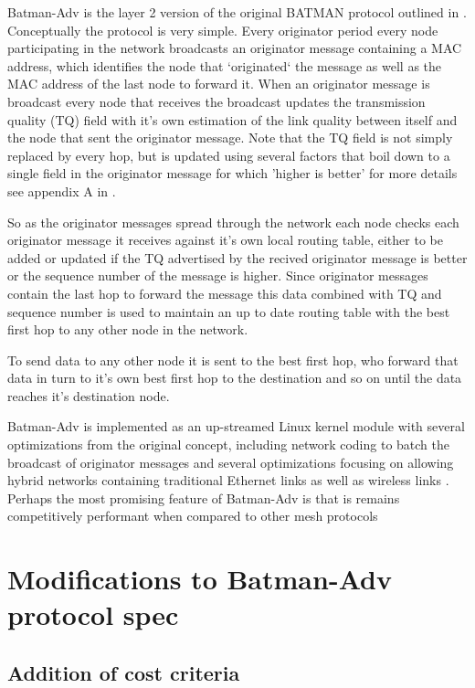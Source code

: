 \documentclass[11pt]{article}
\begin{document}
    Batman-Adv is the layer 2 version of the original BATMAN protocol outlined in \cite{batman}. Conceptually the protocol is very simple. Every originator period every node participating in the network broadcasts an originator message containing a MAC address, which identifies the node that `originated` the message as well as the MAC address of the last node to forward it.  When an originator message is broadcast every node that receives the broadcast updates the transmission quality (TQ) field with it's own estimation of the link quality between itself and the node that sent the originator message. Note that the TQ field is not simply replaced by every hop, but is updated using several factors that boil down to a single field in the originator message for which 'higher is better' for more details see appendix A in \cite{batroam}.
    
    So as the originator messages spread through the network each node checks each originator message it receives against it's own local routing table, either to be added or updated if the TQ advertised by the recived originator message is better or the sequence number of the message is higher. Since originator messages contain the last hop to forward the message this data combined with TQ and sequence number is used to maintain an up to date routing table with the best first hop to any other node in the network.
    
    To send data to any other node it is sent to the best first hop, who forward that data in turn to it's own best first hop to the destination and so on until the data reaches it's destination node.
    
    Batman-Adv is implemented as an up-streamed Linux kernel module with several optimizations from the original concept, including network coding to batch the broadcast of originator messages and several optimizations focusing on allowing hybrid networks containing traditional Ethernet links as well as wireless links \cite{catwoman}. Perhaps the most promising feature of Batman-Adv is that is remains competitively performant when compared to other mesh protocols \cite{meshperf}


\section{Modifications to Batman-Adv protocol spec}

	\subsection{Addition of cost criteria}
\end{document}
